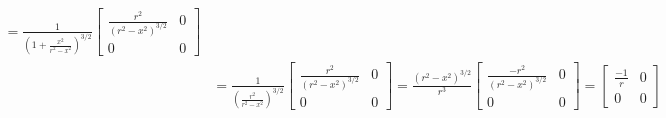 \documentclass[9pt]{beamer}
\begin{document}
\begin{frame}
{\begin{align*}
  = \frac{1}{\left(1+\frac{x^2}{r^2-x^2}\right)^{3/2}}
  \begin{bmatrix} \frac{r^2}{\left(r^2 - x^2\right)^{3/2}} & 0 \\
    0 & 0 \end{bmatrix} \\
  &= \frac{1}{\left(\frac{r^2}{r^2-x^2}\right)^{3/2}}
  \begin{bmatrix} \frac{r^2}{\left(r^2 - x^2\right)^{3/2}} & 0 \\
    0 & 0 \end{bmatrix}
  = \frac{\left(r^2-x^2\right)^{3/2}}{r^3}
  \begin{bmatrix} \frac{-r^2}{\left(r^2-x^2\right)^{3/2}} & 0 \\ 0 & 0 \end{bmatrix}
  = \begin{bmatrix} \frac{-1}{r} & 0 \\ 0 & 0 \end{bmatrix}
  \end{align*}
}
\end{frame}
\end{document}
